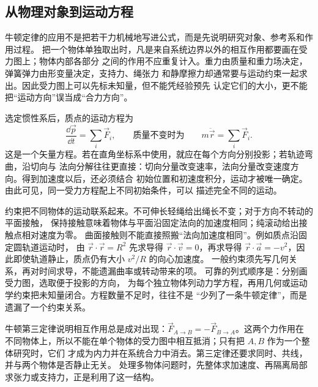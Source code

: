 \subsection{从物理对象到运动方程}

牛顿定律的应用不是把若干力机械地写进公式，而是先说明研究对象、参考系和作用过程。
把一个物体单独取出时，凡是来自系统边界以外的相互作用都要画在受力图上；物体内部各部分
之间的作用不应重复计入。重力由质量和重力场决定，弹簧弹力由形变量决定，支持力、绳张力
和静摩擦力却通常要与运动约束一起求出。因此受力图上可以先标未知量，但不能凭经验预先
认定它们的大小，更不能把“运动方向”误当成“合力方向”。

选定惯性系后，质点的运动方程为
\begin{equation}
 \frac{\dd\vec p}{\dd t}=\sum_i\vec F_i,
 \qquad\text{质量不变时为}\qquad
 m\ddot{\vec r}=\sum_i\vec F_i.
\end{equation}
这是一个矢量方程。若在直角坐标系中使用，就应在每个方向分别投影；若轨迹弯曲，沿切向与
法向分解往往更直接：切向分量改变速率，法向分量改变速度方向。得到加速度以后，还必须结合
初始位置和初速度积分，运动才被唯一确定。由此可见，同一受力方程配上不同初始条件，可以
描述完全不同的运动。

约束把不同物体的运动联系起来。不可伸长轻绳给出绳长不变；对于方向不转动的平面接触，
保持接触意味着物体与平面沿固定法向的加速度相同；纯滚动给出接触点相对速度为零。
曲面接触则不能直接照搬“法向加速度相同”。例如质点沿固定圆轨道运动时，
由 $\vec r\cdot\vec r=R^2$ 先求导得 $\vec r\cdot\vec v=0$，再求导得
$\vec r\cdot\vec a=-v^2$，因此即使轨道静止，质点仍有大小 $v^2/R$ 的向心加速度。
一般约束须先写几何关系，再对时间求导，不能遗漏曲率或转动带来的项。
可靠的列式顺序是：分别画受力图，选取便于投影的方向，
为每个独立物体列动力学方程，再用几何或运动学约束把未知量闭合。方程数量不足时，往往不是
“少列了一条牛顿定律”，而是遗漏了一个约束关系。

牛顿第三定律说明相互作用总是成对出现：$\vec F_{A\to B}=-\vec F_{B\to A}$。这两个力作用在
不同物体上，所以不能在单个物体的受力图中相互抵消；只有把 $A,B$ 作为一个整体研究时，它们
才成为内力并在系统合力中消去。第三定律还要求同时、共线，并与两个物体是否静止无关。
处理多物体问题时，先整体求加速度、再隔离局部求张力或支持力，正是利用了这一结构。
